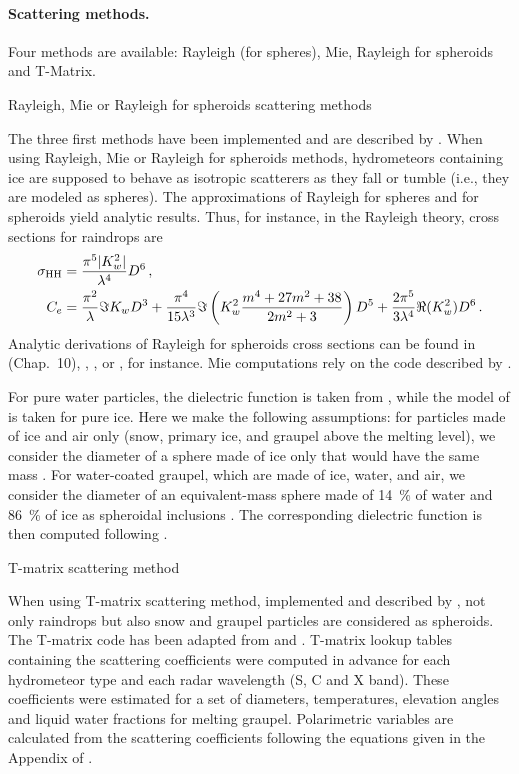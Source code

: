 \paragraph{Scattering methods.}
Four methods are available: Rayleigh (for spheres), Mie, Rayleigh for spheroids and T-Matrix.

\begin{description}
\item {Rayleigh, Mie or Rayleigh for spheroids scattering methods}
  
The three first methods have been implemented and are described by \citet{Caumont2006}. 
When using Rayleigh, Mie or Rayleigh for spheroids methods,
hydrometeors containing ice are supposed to behave as isotropic scatterers as they fall or tumble (i.e., they are modeled as spheres).
The approximations of Rayleigh for spheres and for spheroids yield analytic results. Thus, for instance, in the Rayleigh theory, cross sections for raindrops are
\begin{align}
\sigma_{\rm HH}&=\frac{\pi^5|K_w^2|}{\lambda^4}D^6\,,\\
C_e&=\frac{\pi^2}\lambda\Im K_wD^3+\frac{\pi^4}{15\lambda^3}\Im\left(K_w^2\frac{m^4+27m^2+38}{2m^2+3}\right)D^5+\frac{2\pi^5}{3\lambda^4}\Re(K_w^2)D^6\,.
\end{align}
Analytic derivations of Rayleigh for spheroids cross sections can be found in \citet{Kerker1969} (Chap.~10), \citet{vandeHulst1981}, \citet{Doviak1993}, or \citet{Bringi2001}, for instance.
Mie computations rely on the code described by \citet{Bohren1983}. 

For pure water particles, the dielectric function is taken from \citet{Liebe1991}, while the model of \citet{Hufford1991} is taken for pure ice.  Here we make the following assumptions: for particles made of ice and air only (snow, primary ice, and graupel above the melting level), we consider the diameter of a sphere made of ice only that would have the same mass \citep[e.g.,][]{Smith1984}. For water-coated graupel, which are made of ice, water, and air, we consider the diameter of an equivalent-mass sphere made of 14~\% of water and 86~\% of ice as spheroidal inclusions \citep[following][]{Rasmussen1984}. The corresponding dielectric function is then computed following \citet{Bohren1982}.

\item{T-matrix scattering method}

When using T-matrix scattering method, implemented and described by \citet{Augros2016}, not only raindrops but also snow and graupel particles are considered as spheroids. 
The T-matrix code has been adapted from \citet{Mishchenko1998} and \citet{Mishchenko2002}. T-matrix lookup tables
containing the scattering coefficients were computed in advance
for each hydrometeor type and each radar wavelength (S, C and
X band). These coefficients were estimated for a set of diameters,
temperatures, elevation angles and liquid water fractions for
melting graupel. Polarimetric variables are calculated from the scattering coefficients following the equations given in the Appendix of \citet{Augros2016}.


\end{description}
